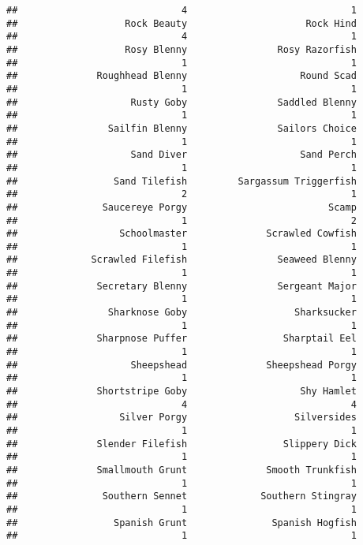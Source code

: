 \documentclass[
]{article}
\begin{document}
\begin{verbatim}
##                             4                             1 
##                   Rock Beauty                     Rock Hind 
##                             4                             1 
##                   Rosy Blenny                Rosy Razorfish 
##                             1                             1 
##              Roughhead Blenny                    Round Scad 
##                             1                             1 
##                    Rusty Goby                Saddled Blenny 
##                             1                             1 
##                Sailfin Blenny                Sailors Choice 
##                             1                             1 
##                    Sand Diver                    Sand Perch 
##                             1                             1 
##                 Sand Tilefish         Sargassum Triggerfish 
##                             2                             1 
##               Saucereye Porgy                         Scamp 
##                             1                             2 
##                  Schoolmaster              Scrawled Cowfish 
##                             1                             1 
##             Scrawled Filefish                Seaweed Blenny 
##                             1                             1 
##              Secretary Blenny                Sergeant Major 
##                             1                             1 
##                Sharknose Goby                   Sharksucker 
##                             1                             1 
##              Sharpnose Puffer                 Sharptail Eel 
##                             1                             1 
##                    Sheepshead              Sheepshead Porgy 
##                             1                             1 
##              Shortstripe Goby                    Shy Hamlet 
##                             4                             4 
##                  Silver Porgy                   Silversides 
##                             1                             1 
##              Slender Filefish                 Slippery Dick 
##                             1                             1 
##              Smallmouth Grunt              Smooth Trunkfish 
##                             1                             1 
##               Southern Sennet             Southern Stingray 
##                             1                             1 
##                 Spanish Grunt               Spanish Hogfish 
##                             1                             1 

\end{verbatim}
\end{document}
